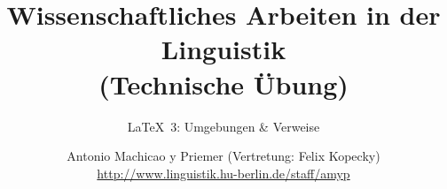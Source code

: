 


\title{
	Wissenschaftliches Arbeiten in der Linguistik\\
	(Technische Übung)
}

\subtitle{\LaTeX\ 3: Umgebungen \& Verweise}

\author[aMyP]{
	{\small Antonio Machicao y Priemer (Vertretung: Felix Kopecky)}
	\\
	{\footnotesize \url{http://www.linguistik.hu-berlin.de/staff/amyp}}
}

 






\begin{frame}
	\HUtitle
\end{frame}




\nocite{Freitag&MyP15a}
\nocite{Knuth1986}
\nocite{Kopka94a}
\nocite{MyP17c}
\nocite{MyP&Kerkhof16a}
	



